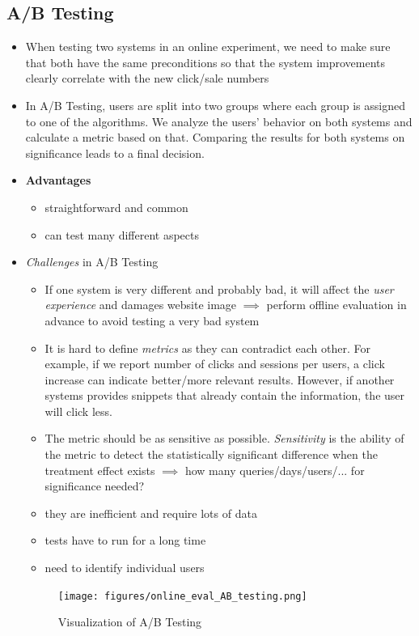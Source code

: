 \subsection{A/B Testing}
\begin{itemize}
	\item When testing two systems in an online experiment, we need to make sure that both have the same preconditions so that the system improvements clearly correlate with the new click/sale numbers
	\item In A/B Testing, users are split into two groups where each group is assigned to one of the algorithms. We analyze the users' behavior on both systems and calculate a metric based on that. Comparing the results for both systems on significance leads to a final decision.
	\item \textbf{Advantages}
	\begin{itemize}
		\item straightforward and common
		\item can test many different aspects
	\end{itemize}
	\item \textit{Challenges} in A/B Testing
	\begin{itemize}
		\item If one system is very different and probably bad, it will affect the \textit{user experience} and damages website image $\implies$ perform offline evaluation in advance to avoid testing a very bad system
		\item It is hard to define \textit{metrics} as they can contradict each other. For example, if we report number of clicks and sessions per users, a click increase can indicate better/more relevant results. However, if another systems provides snippets that already contain the information, the user will click less.
		\item The metric should be as sensitive as possible. \textit{Sensitivity} is the ability of the metric to detect the statistically significant difference when the treatment effect exists $\implies$ how many queries/days/users/... for significance needed?
		\item they are inefficient and require lots of data
		\item tests have to run for a long time
		\item need to identify individual users
	\end{itemize}

	\begin{figure}[ht]
		\centering
		\texttt{[image: figures/online\_eval\_AB\_testing.png]}
		\caption{Visualization of A/B Testing}
		\label{img:online_eval_AB_testing}
	\end{figure}
\end{itemize}
